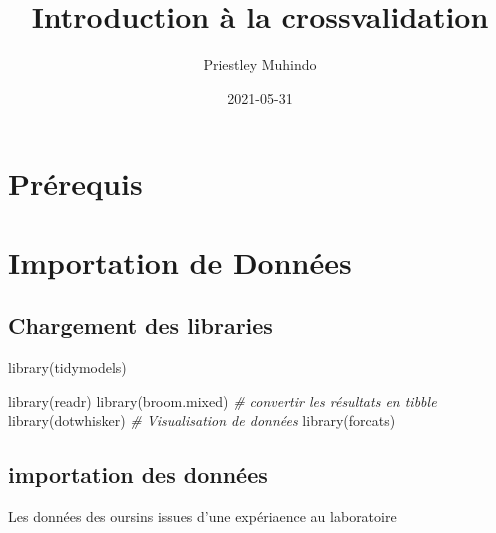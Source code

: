 \documentclass[
]{book}
\title{Introduction à la crossvalidation}
\author{Priestley Muhindo}
\date{2021-05-31}
\newenvironment{Shaded}{\begin{snugshade}}{\end{snugshade}}
\newcommand{\CommentTok}[1]{\textcolor[rgb]{0.56,0.35,0.01}{\textit{#1}}}
\newcommand{\FunctionTok}[1]{\textcolor[rgb]{0.00,0.00,0.00}{#1}}
\newcommand{\NormalTok}[1]{#1}
\begin{document}
\maketitle

{
\setcounter{tocdepth}{1}
\tableofcontents
}
\hypertarget{pruxe9requis}{%
\chapter{Prérequis}\label{pruxe9requis}}

\hypertarget{importation}{%
\chapter{Importation de Données}\label{importation}}

\hypertarget{chargement-des-libraries}{%
\section{Chargement des libraries}\label{chargement-des-libraries}}

\begin{Shaded}
\begin{Highlighting}[]
\FunctionTok{library}\NormalTok{(tidymodels)  }

\FunctionTok{library}\NormalTok{(readr)       }
\FunctionTok{library}\NormalTok{(broom.mixed) }\CommentTok{\# convertir les résultats en tibble}
\FunctionTok{library}\NormalTok{(dotwhisker) }\CommentTok{\# Visualisation de données}
\FunctionTok{library}\NormalTok{(forcats)}
\end{Highlighting}
\end{Shaded}

\hypertarget{importation-des-donnuxe9es}{%
\section{importation des données}\label{importation-des-donnuxe9es}}

Les données des oursins issues d'une expériaence au laboratoire
\end{document}
